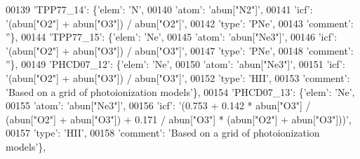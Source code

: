 \begin{DoxyCode}
00139                          \textcolor{stringliteral}{'TPP77\_14'}: \{\textcolor{stringliteral}{'elem'}: \textcolor{stringliteral}{'N'},
00140                                       \textcolor{stringliteral}{'atom'}: \textcolor{stringliteral}{'abun["N2"]'},
00141                                       \textcolor{stringliteral}{'icf'}: \textcolor{stringliteral}{'(abun["O2"] + abun["O3"]) / abun["O2"]'},
00142                                       \textcolor{stringliteral}{'type'}: \textcolor{stringliteral}{'PNe'},
00143                                       \textcolor{stringliteral}{'comment'}: \textcolor{stringliteral}{''}\},
00144                          \textcolor{stringliteral}{'TPP77\_15'}: \{\textcolor{stringliteral}{'elem'}: \textcolor{stringliteral}{'Ne'},
00145                                       \textcolor{stringliteral}{'atom'}: \textcolor{stringliteral}{'abun["Ne3"]'},
00146                                       \textcolor{stringliteral}{'icf'}: \textcolor{stringliteral}{'(abun["O2"] + abun["O3"]) / abun["O3"]'},
00147                                       \textcolor{stringliteral}{'type'}: \textcolor{stringliteral}{'PNe'},
00148                                       \textcolor{stringliteral}{'comment'}: \textcolor{stringliteral}{''}\},
00149                          \textcolor{stringliteral}{'PHCD07\_12'}: \{\textcolor{stringliteral}{'elem'}: \textcolor{stringliteral}{'Ne'},
00150                                        \textcolor{stringliteral}{'atom'}: \textcolor{stringliteral}{'abun["Ne3"]'},
00151                                        \textcolor{stringliteral}{'icf'}: \textcolor{stringliteral}{'(abun["O2"] + abun["O3"]) / abun["O3"]'},
00152                                        \textcolor{stringliteral}{'type'}: \textcolor{stringliteral}{'HII'},
00153                                        \textcolor{stringliteral}{'comment'}: \textcolor{stringliteral}{'Based on a grid of photoionization models'}\},
00154                          \textcolor{stringliteral}{'PHCD07\_13'}: \{\textcolor{stringliteral}{'elem'}: \textcolor{stringliteral}{'Ne'},
00155                                        \textcolor{stringliteral}{'atom'}: \textcolor{stringliteral}{'abun["Ne3"]'},
00156                                        \textcolor{stringliteral}{'icf'}: \textcolor{stringliteral}{'(0.753 + 0.142 * abun["O3"] / (abun["O2"] + abun["O3"]) +
       0.171 / abun["O3"] * (abun["O2"] + abun["O3"]))'},
00157                                        \textcolor{stringliteral}{'type'}: \textcolor{stringliteral}{'HII'},
00158                                        \textcolor{stringliteral}{'comment'}: \textcolor{stringliteral}{'Based on a grid of photoionization models'}\},

\end{DoxyCode}
